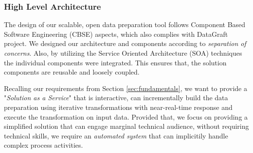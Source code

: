 \subsubsection{High Level Architecture}
The design of our scalable, open data preparation tool follows Component Based Software Engineering (CBSE) \cite{CBSE} aspects, which also complies with DataGraft project. We designed our architecture and components according to \textit{separation of concerns}. Also, by utilizing the Service Oriented Architecture (SOA) techniques the individual components were integrated. This ensures that, the solution components are reusable and loosely coupled. 

Recalling our requirements from Section \ref{sec:fundamentals}, we want to provide a "\textit{Solution as a Service}" that is interactive, can incrementally build the data preparation using iterative transformations with near-real-time response and execute the transformation on input data. Provided that, we focus on providing a simplified solution that can engage marginal technical audience, without requiring technical skills, we require an \textit{automated system} that can  implicitily handle complex process activities. 

